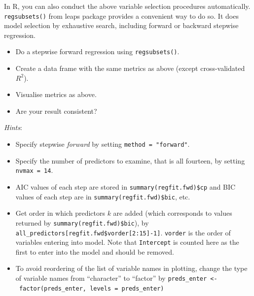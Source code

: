 \documentclass[
]{book}
\providecommand{\tightlist}{%
  \setlength{\itemsep}{0pt}\setlength{\parskip}{0pt}}
\begin{document}
In R, you can also conduct the above variable selection procedures automatically. \texttt{regsubsets()} from leaps package provides a convenient way to do so. It does model selection by exhaustive search, including forward or backward stepwise regression.

\begin{itemize}
\tightlist
\item
  Do a stepwise forward regression using \texttt{regsubsets()}.
\item
  Create a data frame with the same metrics as above (except cross-validated \(R^2\)).
\item
  Visualise metrics as above.
\item
  Are your result consistent?
\end{itemize}

\emph{Hints}:

\begin{itemize}
\tightlist
\item
  Specify stepwise \emph{forward} by setting \texttt{method\ =\ "forward"}.
\item
  Specify the number of predictors to examine, that is all fourteen, by setting \texttt{nvmax\ =\ 14}.
\item
  AIC values of each step are stored in \texttt{summary(regfit.fwd)\$cp} and BIC values of each step are in \texttt{summary(regfit.fwd)\$bic}, etc.
\item
  Get order in which predictors \(k\) are added (which corresponds to values returned by \texttt{summary(regfit.fwd)\$bic}), by \texttt{all\_predictors{[}regfit.fwd\$vorder{[}2:15{]}-1{]}}. \texttt{vorder} is the order of variables entering into model. Note that \texttt{Intercept} is counted here as the first to enter into the model and should be removed.
\item
  To avoid reordering of the list of variable names in plotting, change the type of variable names from ``character'' to ``factor'' by \texttt{preds\_enter\ \textless{}-\ factor(preds\_enter,\ levels\ =\ preds\_enter)}
\end{itemize}
\end{document}
